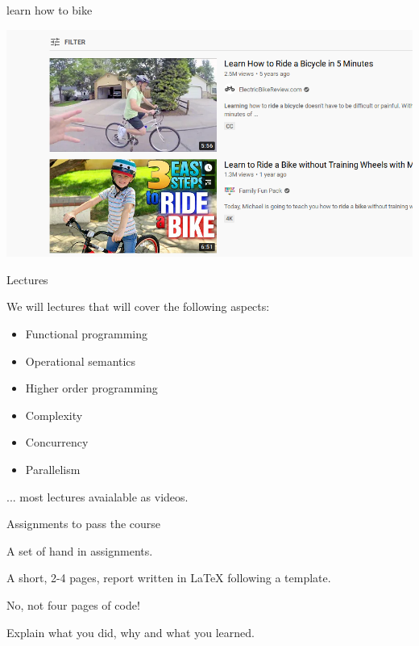 \begin{frame}{learn how to bike}

  \pause
  \includegraphics[scale=0.6]{learn.png} 

\end{frame}

\begin{frame}{Lectures}

   We will lectures that will cover the following aspects:

  \begin{itemize}
    \item Functional programming
\pause
    \item Operational semantics
\pause
    \item Higher order programming
\pause
    \item Complexity 
\pause
    \item Concurrency 
\pause
    \item Parallelism
  \end{itemize}

\vspace{20pt}\hspace{40pt} ... most lectures avaialable as videos.  

\end{frame}

\begin{frame}{Assignments to pass the course}

  A set of hand in assignments.

  \vspace{20pt}\pause
  A short, 2-4 pages, report written in LaTeX following a template.

  \vspace{20pt}\pause
  No, not four pages of code!

  \vspace{20pt}\pause
  Explain what you did, why and what you learned.

\end{frame}


